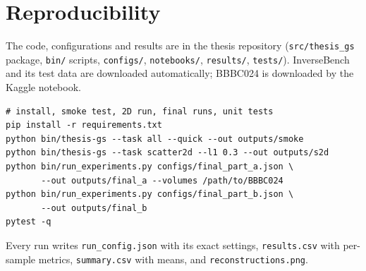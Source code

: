 \chapter{Reproducibility}
\label{app:repro}

The code, configurations and results are in the thesis repository (\texttt{src/thesis\_gs} package, \texttt{bin/}
scripts, \texttt{configs/}, \texttt{notebooks/}, \texttt{results/}, \texttt{tests/}). InverseBench and its test data are
downloaded automatically; BBBC024 is downloaded by the Kaggle notebook.

{\small
\begin{verbatim}
# install, smoke test, 2D run, final runs, unit tests
pip install -r requirements.txt
python bin/thesis-gs --task all --quick --out outputs/smoke
python bin/thesis-gs --task scatter2d --l1 0.3 --out outputs/s2d
python bin/run_experiments.py configs/final_part_a.json \
       --out outputs/final_a --volumes /path/to/BBBC024
python bin/run_experiments.py configs/final_part_b.json \
       --out outputs/final_b
pytest -q
\end{verbatim}
}

Every run writes \texttt{run\_config.json} with its exact settings, \texttt{results.csv} with per-sample metrics,
\texttt{summary.csv} with means, and \texttt{reconstructions.png}.
